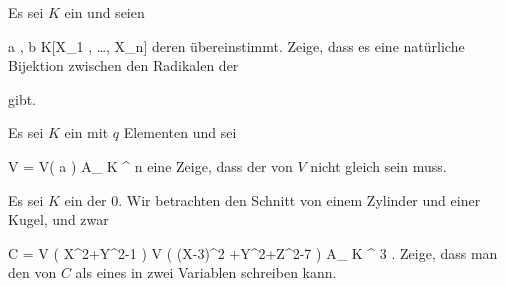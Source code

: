 {}
{





Es sei $K$ ein
und seien

\mavergleichskettedisp
{\vergleichskette
{ {\mathfrak a} , {\mathfrak b}
}
{ \subseteq} { K[X_1 , \ldots , X_n]
}
{ } {
}
{ } {
}
{ } {
}
}
{}{}{}
deren
übereinstimmt. Zeige, dass es eine natürliche Bijektion zwischen den Radikalen der

 {  }

gibt.





}
{} {}

{}
{





Es sei $K$ ein
mit $q$ Elementen und sei

\mavergleichskette
{\vergleichskette
{ V
}
{ = }{ V( {\mathfrak a} )
}
{ \subseteq }{ { {\mathbb A}_{  K }^{  n   } }
}
{    }{
}
{   }{
}
}
{}{}{}
eine
Zeige, dass der
von $V$ nicht gleich
 sein muss.





}
{} {}

{}
{





Es sei $K$ ein
der
$0$. Wir betrachten den Schnitt von einem Zylinder und einer Kugel, und zwar

\mavergleichskettedisp
{\vergleichskette
{ C
}
{ =} { V \left(  X^2+Y^2-1  \right)  \cap V \left(  (X-3)^2 +Y^2+Z^2-7  \right)
}
{ \subseteq} { { {\mathbb A}_{  K  }^{  3   } }
}
{ } {
}
{ } {
}
}
{}{}{.}
Zeige, dass man den
von $C$ als
eines
in zwei Variablen schreiben kann.





}
{} {}





